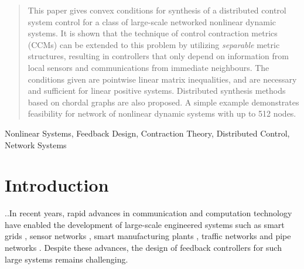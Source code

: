 \documentclass[10pt,twocolumn,twoside]{IEEEtran}
\newcounter{para}
\newcommand\mypara{\par \thesection.\refstepcounter{para}\thepara.\space}
\theoremstyle{plain}
\theoremstyle{definition}
\theoremstyle{remark}
\begin{document}
\maketitle

\begin{abstract}
This paper gives convex conditions for synthesis of a distributed  control system control for a class of large-scale networked nonlinear dynamic systems.  It is shown that the technique of control contraction metrics (CCMs) can be extended to this problem by utilizing {\em separable} metric structures, resulting in controllers that only depend on information from local sensors and communications from immediate neighbours. The conditions given are pointwise linear matrix inequalities, and are necessary and sufficient for linear positive systems. Distributed synthesis methods based on chordal graphs are also proposed. A simple example demonstrates feasibility for network  of nonlinear dynamic systems with up to 512 nodes.
\end{abstract}

\begin{IEEEkeywords}
Nonlinear Systems, Feedback Design, Contraction Theory, Distributed Control, Network Systems
\end{IEEEkeywords}






%
\IEEEpeerreviewmaketitle



\section{Introduction}

\mypara In recent years, rapid advances in communication and  computation technology have enabled the development of large-scale engineered systems such as smart grids \cite{hill_smart_2012}, sensor networks \cite{Pajic2011}, smart manufacturing plants \cite{wang_implementing_2016}, traffic networks \cite{CanudasdeWitMorbidiLeonOjedaEtAl2015} and pipe networks \cite{Persis2011a}. Despite these advances, the design of feedback controllers for such large systems remains challenging.
\end{document}
